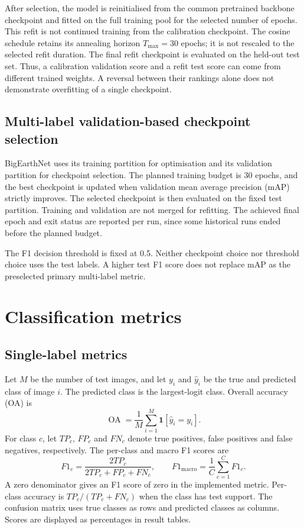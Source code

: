 After selection, the model is reinitialised from the common pretrained
backbone checkpoint and fitted on the full training pool for the selected
number of epochs. This refit is not continued training from the calibration
checkpoint. The cosine schedule retains its annealing horizon $T_{\max}=30$ epochs;
it is not rescaled to the selected refit duration. The final refit checkpoint
is evaluated on the held-out test set. Thus, a calibration validation score
and a refit test score can come from different trained weights. A reversal
between their rankings alone does not demonstrate overfitting of a single
checkpoint.

\subsection{Multi-label validation-based checkpoint selection}

BigEarthNet uses its training partition for optimisation and its validation
partition for checkpoint selection. The planned training budget is 30 epochs,
and the best checkpoint is updated when validation mean average precision
(mAP) strictly improves. The selected checkpoint is then evaluated on the
fixed test partition. Training and validation are not merged for refitting.
The achieved final epoch and exit status are reported per run, since some
historical runs ended before the planned budget.

The F1 decision threshold is fixed at 0.5. Neither checkpoint choice nor
threshold choice uses the test labels. A higher test F1 score does not
replace mAP as the preselected primary multi-label metric.

\section{Classification metrics}

\subsection{Single-label metrics}

Let $M$ be the number of test images, and let $y_i$ and $\hat{y}_i$ be the
true and predicted class of image $i$. The predicted class is the largest-logit
class. Overall accuracy (OA) is
\begin{equation}
 \operatorname{OA}=\frac{1}{M}\sum_{i=1}^{M}
                       \mathbf{1}[\hat{y}_i=y_i].
 \label{eq:oa}
\end{equation}
For class $c$, let $TP_c$, $FP_c$ and $FN_c$ denote true positives, false
positives and false negatives, respectively. The per-class and macro F1
scores are
\begin{equation}
 F1_c=\frac{2TP_c}{2TP_c+FP_c+FN_c},
 \qquad
 F1_{\mathrm{macro}}=\frac{1}{C}\sum_{c=1}^{C}F1_c.
 \label{eq:macro-f1}
\end{equation}
A zero denominator gives an F1 score of zero in the implemented metric.
Per-class accuracy is $TP_c/(TP_c+FN_c)$ when the class has test support.
The confusion matrix uses true classes as rows and predicted classes as
columns. Scores are displayed as percentages in result tables.

